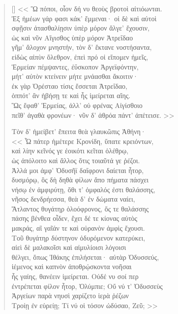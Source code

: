 \documentclass[10pt, twoside]{lecturenotes}
\begin{document}
{\begin{verse}[\versewidth]
<< Ὣ πόποι, οἷον δή νυ θεοὺς βροτοὶ αἰτιόωνται.\\
Ἐξ ἡμέων γάρ φασι κάκ' ἔμμεναι· οἱ δὲ καὶ αὐτοὶ\\
σφῇσιν ἀτασθαλίῃσιν ὑπὲρ μόρον ἄλγε' ἔχουσιν,\\
ὡς καὶ νῦν Αἴγισθος ὑπὲρ μόρον Ἀτρεΐδαο \\
γῆμ' ἄλοχον μνηστήν, τὸν δ' ἔκτανε νοστήσαντα,\\
εἰδὼς αἰπὺν ὄλεθρον, ἐπεὶ πρό οἱ εἴπομεν ἡμεῖς,\\
Ἑρμείαν πέμψαντες, ἐΰσκοπον Ἀργεϊφόντην,\\
μήτ' αὐτὸν κτείνειν μήτε μνάασθαι ἄκοιτιν·\\
ἐκ γὰρ Ὀρέσταο τίσις ἔσσεται Ἀτρεΐδαο, \\
ὁππότ' ἂν ἡβήσῃ τε καὶ ἧς ἱμείρεται αἴης.\\
Ὣς ἔφαθ' Ἑρμείας, ἀλλ' οὐ φρένας Αἰγίσθοιο\\
πεῖθ' ἀγαθὰ φρονέων· νῦν δ' ἁθρόα πάντ' ἀπέτεισε. >>

Τὸν δ' ἠμείβετ' ἔπειτα θεὰ γλαυκῶπις Ἀθήνη·       \\
<< Ὦ πάτερ ἡμέτερε Κρονίδη, ὕπατε κρειόντων, \\
καὶ λίην κεῖνός γε ἐοικότι κεῖται ὀλέθρῳ,\\
ὡς ἀπόλοιτο καὶ ἄλλος ὅτις τοιαῦτά γε ῥέζοι.\\
Ἀλλά μοι ἀμφ' Ὀδυσῆϊ δαΐφρονι δαίεται ἦτορ,\\
δυσμόρῳ, ὃς δὴ δηθὰ φίλων ἄπο πήματα πάσχει\\
νήσῳ ἐν ἀμφιρύτῃ, ὅθι τ' ὀμφαλός ἐστι θαλάσσης,\\ 
νῆσος δενδρήεσσα, θεὰ δ' ἐν δώματα ναίει,\\
Ἄτλαντος θυγάτηρ ὀλοόφρονος, ὅς τε θαλάσσης\\
πάσης βένθεα οἶδεν, ἔχει δέ τε κίονας αὐτὸς\\
μακράς, αἳ γαῖάν τε καὶ οὐρανὸν ἀμφὶς ἔχουσι.\\
Τοῦ θυγάτηρ δύστηνον ὀδυρόμενον κατερύκει, \\
αἰεὶ δὲ μαλακοῖσι καὶ αἱμυλίοισι λόγοισι\\
θέλγει, ὅπως Ἰθάκης ἐπιλήσεται· αὐτὰρ Ὀδυσσεύς,\\
ἱέμενος καὶ καπνὸν ἀποθρῴσκοντα νοῆσαι\\
ἧς γαίης, θανέειν ἱμείρεται. Οὐδέ νυ σοί περ\\
ἐντρέπεται φίλον ἦτορ, Ὀλύμπιε; Οὔ νύ τ' Ὀδυσσεὺς \\
Ἀργείων παρὰ νηυσὶ χαρίζετο ἱερὰ ῥέζων\\
Τροίῃ ἐν εὐρείῃ; Τί νύ οἱ τόσον ὠδύσαο, Ζεῦ; >>
\end{verse}
}
\newpage
\end{document}
